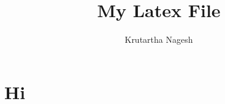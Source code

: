 \documentclass{article}
\title{My Latex File}
\author{Krutartha Nagesh}
\begin{document}
\maketitle
    \section{Hi}
\end{document}
